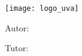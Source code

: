 \documentclass{subfiles}
\begin{document}
  \begin{titlepage}

    \centering
    \texttt{[image: logo\_uva]}\par\vspace{1cm}

    {\scshape\LARGE \theschool \par}
    \vspace{0.5cm}

    {\scshape\Large \thesubject\par}
    \vspace{1.25cm}

    {\scshape\Large \thegrade\par}
    \vspace{3cm}

    {\huge\bfseries \thetitle\par}
    \vspace{2cm}


    {\Large\hfill Autor: \par}
    {\Large\hfill\bfseries \theauthor\par}
    \vspace{1cm}

    {\Large\hfill Tutor: \par}
    {\Large\hfill\bfseries \thesupervisor\par}
    \vfill

  \end{titlepage}
\end{document}
